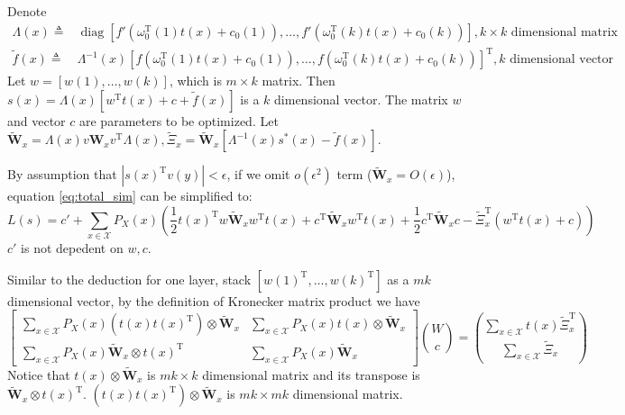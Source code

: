 \documentclass{article}
\DeclareMathOperator{\diag}{diag}
\def\T{\mathrm{T}}
\begin{document}
Denote
\begin{align*}
\Lambda(x) \triangleq & \diag[f'(\omega_0^\T (1) t(x) + c_0 (1) ),\dots,f'(\omega_0^\T (k) t(x) + c_0 (k) )],k\times k\text{ dimensional matrix} \\
\tilde{f}(x) \triangleq & \Lambda^{-1}(x)[f(\omega_0^\T (1) t(x) + c_0 (1) ),\dots,f(\omega_0^\T (k) t(x) + c_0 (k) )]^\T,k \text{ dimensional vector} 
\end{align*}
Let $w=[w(1),\dots,w(k)]$, which is $m\times k$ matrix. Then 
$s(x)=\Lambda(x)[w^\T t(x)+c+\tilde{f}(x)]$ is a $k$ dimensional vector. The matrix $w$ and vector $c$ are parameters to be optimized.
Let $\tilde{\bm{W}}_x=\Lambda(x) v\bm{W}_x v^\T \Lambda(x),\tilde{\Xi}_x=\tilde{\bm{W}}_x [\Lambda^{-1}(x)s^*(x)-\tilde{f}(x)]$.

By assumption that $|s(x)^\T v(y)|<\epsilon$, if we omit $o(\epsilon^2)$ term ($\tilde{\bm{W}}_x=O(\epsilon)$), equation \eqref{eq:total_sim} can be simplified to:
\begin{equation}
L(s)=c' + \sum_{x \in \mathcal{X}} P_X(x)\left(\frac{1}{2}t(x)^\T w \tilde{\bm{W}}_x w^\T t(x) + c^\T \tilde{\bm{W}}_x w^\T t(x) + \frac{1}{2} c^\T \tilde{\bm{W}}_x c - \tilde{\Xi}_x^\T (w^\T t(x)+c)\right)
\end{equation}
$c'$ is not depedent on $w,c$.

Similar to the deduction for one layer, stack $[w(1)^\T,\dots,w(k)^\T]$ as a $mk$ dimensional vector, by the definition of Kronecker matrix product we
have
\begin{equation}
\begin{bmatrix}
\sum_{x\in \mathcal{X}} P_X(x) (t(x)t(x)^\T)\otimes \tilde{\bm{W}}_x & \sum_{x\in \mathcal{X}} P_X(x) t(x)\otimes \tilde{\bm{W}}_x \\
\sum_{x\in \mathcal{X}} P_X(x) \tilde{\bm{W}}_x \otimes t(x)^\T & \sum_{x\in \mathcal{X}} P_X(x)\tilde{\bm{W}}_x
\end{bmatrix}\binom{W}{c}=\binom{\sum_{x\in \mathcal{X}}t(x)\tilde{\Xi}_x^\T}{\sum_{x\in \mathcal{X}}\tilde{\Xi}_x}
\end{equation}
Notice that $t(x)\otimes \tilde{\bm{W}}_x$ is $mk\times k$ dimensional matrix and its transpose is $\tilde{\bm{W}}_x \otimes t(x)^\T$.
$(t(x)t(x)^\T)\otimes \tilde{\bm{W}}_x$ is $mk \times mk$ dimensional matrix.
\end{document}
